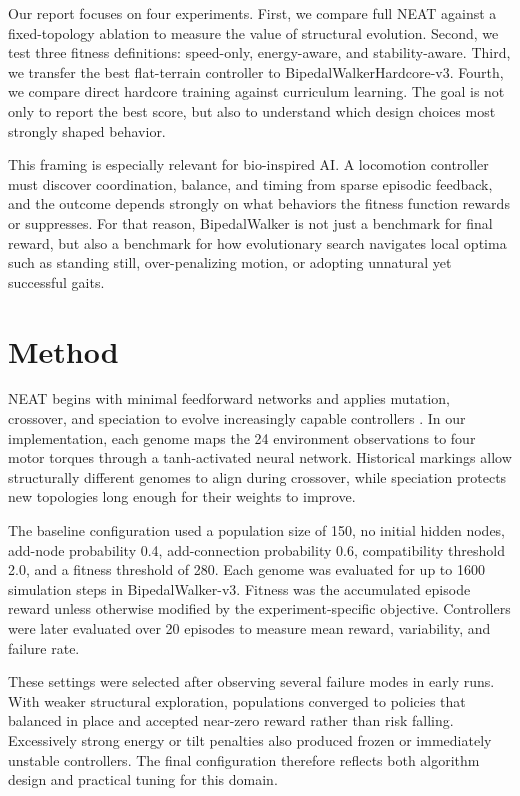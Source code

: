 \documentclass[journal]{IEEEtran}
\begin{document}
Our report focuses on four experiments. First, we compare full NEAT against a fixed-topology ablation to measure the value of structural evolution. Second, we test three fitness definitions: speed-only, energy-aware, and stability-aware. Third, we transfer the best flat-terrain controller to BipedalWalkerHardcore-v3. Fourth, we compare direct hardcore training against curriculum learning. The goal is not only to report the best score, but also to understand which design choices most strongly shaped behavior.

This framing is especially relevant for bio-inspired AI. A locomotion controller must discover coordination, balance, and timing from sparse episodic feedback, and the outcome depends strongly on what behaviors the fitness function rewards or suppresses. For that reason, BipedalWalker is not just a benchmark for final reward, but also a benchmark for how evolutionary search navigates local optima such as standing still, over-penalizing motion, or adopting unnatural yet successful gaits.

\section{Method}
NEAT begins with minimal feedforward networks and applies mutation, crossover, and speciation to evolve increasingly capable controllers \cite{stanley2002}. In our implementation, each genome maps the 24 environment observations to four motor torques through a tanh-activated neural network. Historical markings allow structurally different genomes to align during crossover, while speciation protects new topologies long enough for their weights to improve.

The baseline configuration used a population size of 150, no initial hidden nodes, add-node probability 0.4, add-connection probability 0.6, compatibility threshold 2.0, and a fitness threshold of 280. Each genome was evaluated for up to 1600 simulation steps in BipedalWalker-v3. Fitness was the accumulated episode reward unless otherwise modified by the experiment-specific objective. Controllers were later evaluated over 20 episodes to measure mean reward, variability, and failure rate.

These settings were selected after observing several failure modes in early runs. With weaker structural exploration, populations converged to policies that balanced in place and accepted near-zero reward rather than risk falling. Excessively strong energy or tilt penalties also produced frozen or immediately unstable controllers. The final configuration therefore reflects both algorithm design and practical tuning for this domain.
\end{document}
